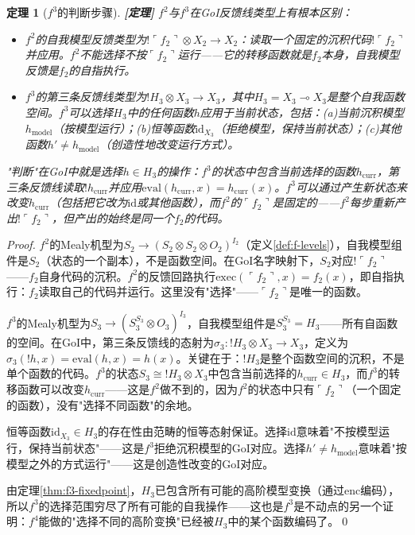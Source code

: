 \documentclass[11pt,a4paper]{article}
\newtheorem{theorem}{定理}
\newcommand{\lvl}[1]{\hfill\textbf{\footnotesize[#1]}}
\newcommand{\lvP}{\lvl{定理}}
\newcommand{\lolli}{\multimap}
\newcommand{\bang}{{!}}
\newcommand{\tensor}{\otimes}
\newcommand{\enc}{\mathrm{enc}}
\begin{document}
\begin{theorem}[$f^3$的判断步骤]\label{thm:f3-judgment}\lvP
$f^2$与$f^3$在GoI反馈线类型上有根本区别：
\begin{itemize}
  \item $f^2$的自我模型反馈类型为$\bang\ulcorner f_2\urcorner\tensor X_2\to X_2$：读取一个\emph{固定的}沉积代码$\bang\ulcorner f_2\urcorner$并应用。$f^2$不能选择不按$\ulcorner f_2\urcorner$运行——它的转移函数就是$f_2$本身，自我模型反馈是$f_2$的自指执行。
  \item $f^3$的第三条反馈线类型为$\bang H_3\tensor X_3\to X_3$，其中$H_3=X_3\lolli X_3$是\emph{整个}自我函数空间。$f^3$可以选择$H_3$中的\emph{任何}函数$h$应用于当前状态，包括：(a)当前沉积模型$h_{\text{model}}$（按模型运行）；(b)恒等函数$\mathrm{id}_{X_3}$（拒绝模型，保持当前状态）；(c)其他函数$h'\neq h_{\text{model}}$（创造性地改变运行方式）。
\end{itemize}
"判断"在GoI中就是选择$h\in H_3$的操作：$f^3$的状态中包含当前选择的函数$h_{\text{curr}}$，第三条反馈线读取$\bang h_{\text{curr}}$并应用$\mathrm{eval}(h_{\text{curr}},x)=h_{\text{curr}}(x)$。$f^3$可以通过产生新状态来改变$h_{\text{curr}}$（包括把它改为$\mathrm{id}$或其他函数），而$f^2$的$\ulcorner f_2\urcorner$是固定的——$f^2$每步重新产出$\bang\ulcorner f_2\urcorner$，但产出的始终是同一个$f_2$的代码。
\end{theorem}

\begin{proof}
$f^2$的Mealy机型为$S_2\to(S_2\tensor S_2\tensor O_2)^{I_2}$（定义\ref{def:f-levels}），自我模型组件是$S_2$（状态的一个副本），不是函数空间。在GoI名字映射下，$S_2$对应$\bang\ulcorner f_2\urcorner$——$f_2$自身代码的沉积。$f^2$的反馈回路执行$\mathrm{exec}(\ulcorner f_2\urcorner,x)=f_2(x)$，即自指执行：$f_2$读取自己的代码并运行。这里没有"选择"——$\ulcorner f_2\urcorner$是唯一的函数。

$f^3$的Mealy机型为$S_3\to(S_3^{S_3}\tensor O_3)^{I_3}$，自我模型组件是$S_3^{S_3}=H_3$——所有自函数的空间。在GoI中，第三条反馈线的态射为$\sigma_3:\bang H_3\tensor X_3\to X_3$，定义为$\sigma_3(\bang h,x)=\mathrm{eval}(h,x)=h(x)$。关键在于：$\bang H_3$是整个函数空间的沉积，不是单个函数的代码。$f^3$的状态$S_3\cong\bang H_3\tensor X_3$中包含当前选择的$h_{\text{curr}}\in H_3$，而$f^3$的转移函数可以改变$h_{\text{curr}}$——这是$f^2$做不到的，因为$f^2$的状态中只有$\ulcorner f_2\urcorner$（一个固定的函数），没有"选择不同函数"的余地。

恒等函数$\mathrm{id}_{X_3}\in H_3$的存在性由范畴的恒等态射保证。选择$\mathrm{id}$意味着"不按模型运行，保持当前状态"——这是$f^3$拒绝沉积模型的GoI对应。选择$h'\neq h_{\text{model}}$意味着"按模型之外的方式运行"——这是创造性改变的GoI对应。

由定理\ref{thm:f3-fixedpoint}，$H_3$已包含所有可能的高阶模型变换（通过$\enc$编码），所以$f^3$的选择范围穷尽了所有可能的自我操作——这也是$f^3$是不动点的另一个证明：$f^4$能做的"选择不同的高阶变换"已经被$H_3$中的某个函数编码了。\qed
\end{proof}
\end{document}
